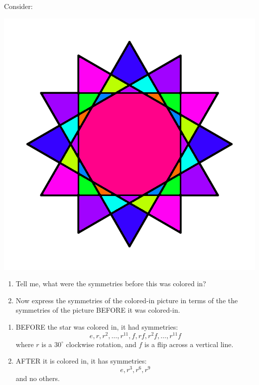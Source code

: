 \documentclass[noauthor,nooutcomes,12pt,hints]{ximera}
\begin{document}
\begin{question}
  Consider: 
  \begin{center}
    \includegraphics[width=.6\textwidth]{qR4D12.png}
  \end{center}
  \begin{enumerate}
  \item Tell me, what were the symmetries before this was colored in?
  \item Now express the symmetries of the colored-in picture in terms
    of the the symmetries of the picture BEFORE it was colored-in.
  \end{enumerate}
  \begin{freeResponse}
    \begin{enumerate}
    \item BEFORE the star was colored in, it had symmetries:
      \[
      e,r,r^2,\dots,r^{11}, f, rf,r^2f, \dots, r^{11}f
      \]
      where $r$ is a $30^\circ$ clockwise rotation, and $f$ is a flip
      across a vertical line.
    \item AFTER it is colored in, it has symmetries:
      \[
      e, r^3, r^6, r^9
      \]
      and no others.
    \end{enumerate}
  \end{freeResponse}
\end{question}
\mynewpage
\end{document}

